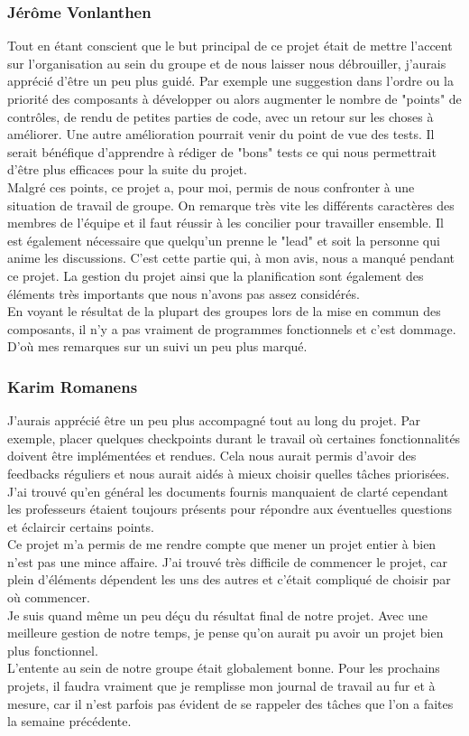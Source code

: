 \documentclass[a4paper, 12pt]{article}
\begin{document}
\subsubsection{Jérôme Vonlanthen}
Tout en étant conscient que le but principal de ce projet était de mettre l'accent sur l'organisation au sein du groupe et de nous laisser nous débrouiller, j'aurais apprécié d'être un peu plus guidé. Par exemple une suggestion dans l'ordre ou la priorité des composants à développer ou alors augmenter le nombre de "points" de contrôles, de rendu de petites parties de code, avec un retour sur les choses à améliorer. Une autre amélioration pourrait venir du point de vue des tests. Il serait bénéfique d'apprendre à rédiger de "bons" tests ce qui nous permettrait d'être plus efficaces pour la suite du projet.\\ 
Malgré ces points, ce projet a, pour moi, permis de nous confronter à une situation de travail de groupe. On remarque très vite les différents caractères des membres de l'équipe et il faut réussir à les concilier pour travailler ensemble. Il est également nécessaire que quelqu'un prenne le "lead" et soit la personne qui anime les discussions. C'est cette partie qui, à mon avis, nous a manqué pendant ce projet. La gestion du projet ainsi que la planification sont également des éléments très importants que nous n'avons pas assez considérés.\\
En voyant le résultat de la plupart des groupes lors de la mise en commun des composants, il n'y a pas vraiment de programmes fonctionnels et c'est dommage. D'où mes remarques sur un suivi un peu plus marqué.
\subsubsection{Karim Romanens}
J'aurais apprécié être un peu plus accompagné tout au long du projet. Par exemple, placer quelques checkpoints durant le travail où certaines fonctionnalités doivent être implémentées et rendues. Cela nous aurait permis d'avoir des feedbacks réguliers et nous aurait aidés à mieux choisir quelles tâches priorisées.\\ J'ai trouvé qu'en général les documents fournis manquaient de clarté cependant les professeurs étaient toujours présents pour répondre aux éventuelles questions et éclaircir certains points. \\ Ce projet m'a permis de me rendre compte que mener un projet entier à bien n'est pas une mince affaire. J'ai trouvé très difficile de commencer le projet, car plein d'éléments dépendent les uns des autres et c'était compliqué de choisir par où commencer. \\ Je suis quand même un peu déçu du résultat final de notre projet. Avec une meilleure gestion de notre temps, je pense qu'on aurait pu avoir un projet bien plus fonctionnel.\\ L'entente au sein de notre groupe était globalement bonne. Pour les prochains projets, il faudra vraiment que je remplisse mon journal de travail au fur et à mesure, car il n'est parfois pas évident de se rappeler des tâches que l'on a faites la semaine précédente.
\end{document}
